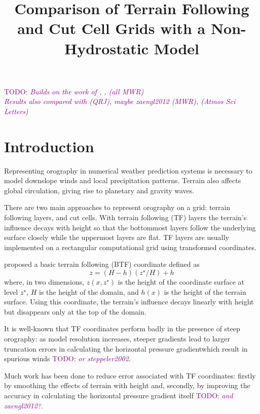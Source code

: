 \documentclass[twocol]{ametsoc}
\title{Comparison of Terrain Following and Cut Cell Grids with a Non-Hydrostatic Model}
\affiliation{}
\begin{document}
\newcommand{\TODO}[1]{\textcolor{purple}{TODO: \emph{#1}}}

\maketitle

\TODO{Builds on the work of \citet{schaer2002}, \citet{klemp2011}, \citet{weller-shahrokhi2014} (all MWR) \\
Results also compared with \citet{melvin2010} (QRJ), maybe zaengl2012 (MWR), \citet{good2014} (Atmos Sci Letters)}

\section{Introduction}
Representing orography in numerical weather prediction systems is necessary to model downslope winds and local precipitation patterns.  Terrain also affects global circulation, giving rise to planetary and gravity waves.

There are two main approaches to represent orography on a grid: terrain following layers, and cut cells.  With terrain following (TF) layers the terrain's influence decays with height so that the bottommost layers follow the underlying surface closely while the uppermost layers are flat.  TF layers are usually implemented on a rectangular computational grid using transformed coordinates.

\citet{galchen-somerville1975} proposed a basic terrain following (BTF) coordinate defined as 
\begin{equation}
	z = \left( H - h \right) \left( z^\star / H \right) + h
\end{equation}
where, in two dimensions, \(z(x, z^\star)\) is the height of the coordinate surface at level \(z^\star\), \(H\) is the height of the domain, and \(h(x)\) is the height of the terrain surface.  Using this coordinate, the terrain's influence decays linearly with height but disappears only at the top of the domain.

It is well-known that TF coordinates perform badly in the presence of steep orography: as model resolution increases, steeper gradients lead to larger truncation errors in calculating the horizontal pressure gradientwhich result in spurious winds \citep{dempsey-davis1998} \TODO{or steppeler2002}.

Much work has been done to reduce error associated with TF coordinates: firstly by smoothing the effects of terrain with height \citep{schaer2002,klemp2011} and, secondly, by improving the accuracy in calculating the horizontal pressure gradient itself \citep{klemp2011} \TODO{and zaengl2012?}.
\end{document}
